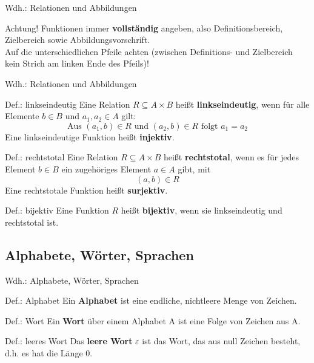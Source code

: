 \begin{frame}{Wdh.: Relationen und Abbildungen}
	\begin{alertblock}{Achtung!}
		Funktionen immer \textbf{vollständig} angeben, also Definitionsbereich, Zielbereich sowie Abbildungsvorschrift. \\
		Auf die unterschiedlichen Pfeile achten (zwischen Definitions- und Zielbereich kein Strich am linken Ende des Pfeils)!
	\end{alertblock}
\end{frame}

\begin{frame}{Wdh.: Relationen und Abbildungen}
	\begin{block}{Def.: linkseindeutig}
	\pause
		Eine Relation $R \subseteq A \times B$ heißt \textbf{linkseindeutig}, wenn für alle Elemente $b \in B$ und $a_1, a_2 \in A$ gilt: $$\text{Aus } (a_1,b) \in R \text{ und } (a_2,b) \in R \text{ folgt } a_1 = a_2$$
		Eine linkseindeutige Funktion heißt \textbf{injektiv}.
	\end{block}
	\pause
	\begin{block}{Def.: rechtstotal}
	\pause
		Eine Relation $R \subseteq A \times B$ heißt \textbf{rechtstotal}, wenn es für jedes Element $b \in B$ ein zugehöriges Element $a \in A$ gibt, mit $$(a,b) \in R$$
		Eine rechtstotale Funktion heißt \textbf{surjektiv}.
	\end{block}
	\pause
	\begin{block}{Def.: bijektiv}
		Eine Funktion $R$ heißt \textbf{bijektiv}, wenn sie linkseindeutig und rechtstotal ist.
	\end{block}
\end{frame}
\subsection{Alphabete, Wörter, Sprachen}
\begin{frame}{Wdh.: Alphabete, Wörter, Sprachen}
	\begin{block}{Def.: Alphabet}
		Ein \textbf{Alphabet} ist eine endliche, nichtleere Menge von Zeichen.
	\end{block}
	\pause
	\begin{block}{Def.: Wort}
		Ein \textbf{Wort} über einem Alphabet A ist eine Folge von Zeichen aus A.
	\end{block}
	\pause
	\begin{block}{Def.: leeres Wort}
		Das \textbf{leere Wort} \(\varepsilon\) ist das Wort, das aus null Zeichen besteht, d.h. es hat die Länge 0.
	\end{block}
\end{frame}

